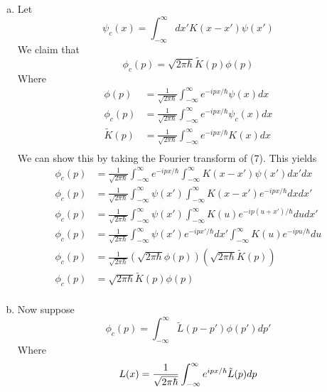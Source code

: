 \documentclass[]{book}
\begin{document}
\begin{enumerate}[(a)]
\item Let
\begin{equation}\label{eq7} \psi_c(x)=\int_{-\infty}^{\infty}dx'K(x-x')\psi(x')
\end{equation}
We claim that
\begin{equation}%
\phi_c(p)=\sqrt{2\pi\hbar}\tilde{K}(p)\phi(p)
\end{equation}
Where
\begin{equation}%
\begin{split}
\phi(p) &= \frac{1}{\sqrt{2\pi\hbar}}\int_{-\infty}^{\infty} e^{-ipx/\hbar}\psi(x) dx \\
\phi_c(p) &=\frac{1}{\sqrt{2\pi\hbar}}\int_{-\infty}^{\infty} e^{-ipx/\hbar}\psi_c(x) dx \\
\tilde{K}(p) &= \frac{1}{\sqrt{2\pi\hbar}}\int_{-\infty}^{\infty} e^{-ipx/\hbar}K(x) dx\\
\end{split}
\end{equation}
We can show this by taking the Fourier transform of (7). This yields
\begin{equation}%
\begin{split}
\phi_c(p) &= \frac{1}{\sqrt{2\pi\hbar}}\int_{-\infty}^{\infty} e^{-ipx/\hbar}\int_{-\infty}^{\infty}K(x-x')\psi(x') dx' dx \\
\phi_c(p) &= \frac{1}{\sqrt{2\pi\hbar}}\int_{-\infty}^{\infty}\psi(x')\int_{-\infty}^{\infty}K(x-x')e^{-ipx/\hbar} dxdx' \\
\phi_c(p) &= \frac{1}{\sqrt{2\pi\hbar}}\int_{-\infty}^{\infty}\psi(x')\int_{-\infty}^{\infty}K(u)e^{-ip(u+x')/\hbar} dudx' \\
\phi_c(p) &= \frac{1}{\sqrt{2\pi\hbar}}\int_{-\infty}^{\infty}\psi(x')e^{-ipx'/\hbar}dx'\int_{-\infty}^{\infty}K(u)e^{-ipu/\hbar} du \\
\phi_c(p) &= \frac{1}{\sqrt{2\pi\hbar}} (\sqrt{2\pi\hbar}\phi(p))(\sqrt{2\pi\hbar}\tilde{K}(p)) \\
\phi_c(p) &= \sqrt{2\pi\hbar}\tilde{K}(p)\phi(p) \\
\end{split}
\end{equation}
\item Now suppose
\begin{equation}%
\phi_c(p) = \int_{-\infty}^{\infty}\tilde{L}(p-p')\phi(p')dp'
\end{equation}
Where
\begin{equation}%
L(x)=\frac{1}{\sqrt{2\pi\hbar}}\int_{-\infty}^{\infty} e^{ipx/\hbar}\tilde{L}(p) dp\\

\end{equation}
\end{enumerate}
\end{document}
